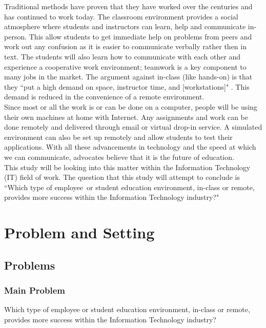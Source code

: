 \documentclass[titlepage]{article}
\begin{document}
\noindent Traditional methods have proven that they have worked over the centuries and has continued to
work today.  The classroom environment provides a social atmosphere where students and instructors
can learn, help and communicate in-person.  This allow students to get immediate help on problems
from peers and work out any confusion as it is easier to communicate verbally rather then in text.
The students will also learn how to communicate with each other and experience a cooperative work
environment; teamwork is a key component to many jobs in the market.  The argument against in-class
(like hands-on) is that they ``put a high demand on space, instructor time, and [workstations]" \citep{2}.
This demand is reduced in the convenience of a remote environment.\\

\noindent Since most or all the work is or can be done on a computer, people will be using
their own machines at home with Internet.  Any assignments and work can be done remotely
and delivered through email or virtual drop-in service.  A simulated environment can also be
set up remotely and allow students to test their applications.  With all these advancements
in technology and the speed at which we can communicate, advocates believe that it is the
future of education. \\

\noindent This study will be looking into this matter within the Information Technology (IT) field
of work.  The question that this study will attempt to conclude is ``Which type of employee\
or student education environment, in-class or remote, provides more success within the
Information Technology industry?"

\clearpage

\section{Problem and Setting}

\subsection{Problems}

\subsubsection{Main Problem}
Which type of employee or student education environment, in-class or remote, provides
more success within the Information Technology industry?
\end{document}
